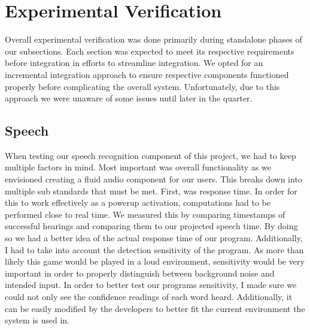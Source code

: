 \documentclass[a4paper,10pt]{article}
\begin{document}
\section{Experimental Verification}

Overall experimental verification was done primarily during standalone phases of our subsections. Each section was expected to meet its respective requirements before integration in efforts to streamline integration. We opted for an incremental integration approach to ensure respective components functioned properly before complicating the overall system. Unfortunately, due to this approach we were unaware of some issues until later in the quarter.

\subsection{Speech}
When testing our speech recognition component of this project, we had to keep multiple factors in mind. Most important was overall functionality as we envisioned creating a fluid audio component for our users. This breaks down into multiple sub standards that must be met. First, was response time. In order for this to work effectively as a powerup activation, computations had to be performed close to real time. We measured this by comparing timestamps of successful hearings and comparing them to our projected speech time. By doing so we had a better idea of the actual response time of our program. Additionally, I had to take into account the detection sensitivity of the program. As more than likely this game would be played in a loud environment, sensitivity would be very important in order to properly distinguish between background noise and intended input. In order to better test our programs sensitivity, I made sure we could not only see the confidence readings of each word heard. Additionally, it can be easily modified by the developers to better fit the current environment the system is used in.
\end{document}
